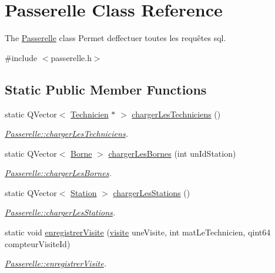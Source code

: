 \hypertarget{class_passerelle}{}\section{Passerelle Class Reference}
\label{class_passerelle}


The \hyperlink{class_passerelle}{Passerelle} class Permet d\textquotesingle{}effectuer toutes les requêtes sql.  




{\ttfamily \#include $<$passerelle.\+h$>$}

\subsection*{Static Public Member Functions}
\begin{DoxyCompactItemize}
\item 
static Q\+Vector$<$ \hyperlink{class_technicien}{Technicien} $\ast$ $>$ \hyperlink{class_passerelle_a231a84d255da1885456f4637d4c88ee5}{charger\+Les\+Techniciens} ()
\begin{DoxyCompactList}\small\item\em \hyperlink{class_passerelle_a231a84d255da1885456f4637d4c88ee5}{Passerelle\+::charger\+Les\+Techniciens}. \end{DoxyCompactList}\item 
static Q\+Vector$<$ \hyperlink{class_borne}{Borne} $>$ \hyperlink{class_passerelle_a82347f95ecee56a567c080102c137ccd}{charger\+Les\+Bornes} (int un\+Id\+Station)
\begin{DoxyCompactList}\small\item\em \hyperlink{class_passerelle_a82347f95ecee56a567c080102c137ccd}{Passerelle\+::charger\+Les\+Bornes}. \end{DoxyCompactList}\item 
static Q\+Vector$<$ \hyperlink{class_station}{Station} $>$ \hyperlink{class_passerelle_a58f4340157dc6a2b5f720cf7ab09c980}{charger\+Les\+Stations} ()
\begin{DoxyCompactList}\small\item\em \hyperlink{class_passerelle_a58f4340157dc6a2b5f720cf7ab09c980}{Passerelle\+::charger\+Les\+Stations}. \end{DoxyCompactList}\item 
static void \hyperlink{class_passerelle_a82488527c9e08f60c905c0ec8a95187a}{enregistrer\+Visite} (\hyperlink{classvisite}{visite} une\+Visite, int mat\+Le\+Technicien, qint64 compteur\+Visite\+Id)
\begin{DoxyCompactList}\small\item\em \hyperlink{class_passerelle_a82488527c9e08f60c905c0ec8a95187a}{Passerelle\+::enregistrer\+Visite}. \end{DoxyCompactList}\end{DoxyCompactItemize}


